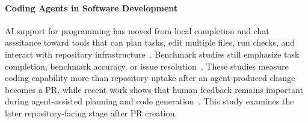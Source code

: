 \documentclass[10pt,conference,anonymous]{IEEEtran}
\begin{document}
\paragraph{Coding Agents in Software Development}
AI support for programming has moved from local completion and chat asssitance toward tools that can plan tasks, edit multiple files, run checks, and interact with repository infrastructure~\cite{pengImpactAIDeveloper2023,chenCodeMeMe2025,treudeHowDevelopersInteract2025}.
Benchmark studies still emphasize task completion, benchmark accuracy, or issue resolution~\cite{wangSurveyLargeLanguage2024,liangSWEBenchIllusionWhen2025a}.
These studies measure coding capability more than repository uptake after an agent-produced change becomes a PR, while recent work shows that human feedback remains important during agent-assisted planning and code generation~\cite{takerngsaksiriHumanIntheLoopSoftwareDevelopment2025b}.
This study examines the later repository-facing stage after PR creation.
\end{document}
